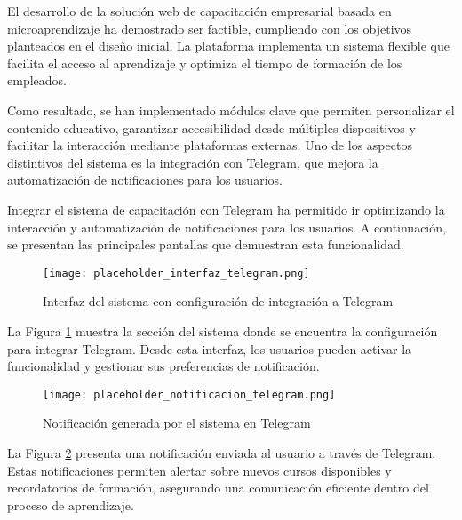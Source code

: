 
El desarrollo de la solución web de capacitación empresarial basada en
microaprendizaje ha demostrado ser factible, cumpliendo con los objetivos
planteados en el diseño inicial. La plataforma implementa un sistema flexible
que facilita el acceso al aprendizaje y optimiza el tiempo de formación de los
empleados.

Como resultado, se han implementado módulos clave que permiten personalizar el
contenido educativo, garantizar accesibilidad desde múltiples dispositivos y
facilitar la interacción mediante plataformas externas. Uno de los aspectos
distintivos del sistema es la integración con Telegram, que mejora la
automatización de notificaciones para los usuarios.

Integrar el sistema de capacitación
con Telegram ha permitido ir optimizando la interacción y automatización de notificaciones para
los usuarios. A continuación, se presentan las principales pantallas que
demuestran esta funcionalidad.

\begin{figure}[htbp]
    \centering
    \texttt{[image: placeholder\_interfaz\_telegram.png]}
    \caption{Interfaz del sistema con configuración de integración a Telegram}
    \label{fig:interfaz_integracion_telegram}
\end{figure}

La Figura \ref{fig:interfaz_integracion_telegram} muestra la sección del sistema
donde se encuentra la configuración para integrar Telegram. Desde esta interfaz,
los usuarios pueden activar la funcionalidad y gestionar sus preferencias de
notificación.

\begin{figure}[htbp]
    \centering
    \texttt{[image: placeholder\_notificacion\_telegram.png]}
    \caption{Notificación generada por el sistema en Telegram}
    \label{fig:notificacion_telegram}
\end{figure}

La Figura \ref{fig:notificacion_telegram} presenta una notificación enviada al
usuario a través de Telegram. Estas notificaciones permiten alertar sobre nuevos
cursos disponibles y recordatorios de formación, asegurando una comunicación
eficiente dentro del proceso de aprendizaje.


